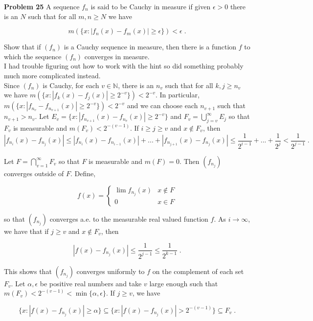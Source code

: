 \documentclass[a4paper]{article}
\begin{document}
{\bf Problem 25} A sequence $f_n$ is said to be Cauchy in measure if given $\epsilon > 0$ there is an $N$ such that for all $m,n \geq N$ we have

$$m\left(\{x : |f_n(x) - f_m(x)| \geq \epsilon \}\right) < \epsilon \;.$$

Show that if $(f_n)$ is a Cauchy sequence in measure, then there is a function $f$ to which the sequence $(f_n)$ converges in measure.\\

I had trouble figuring out how to work with the hint so did something probably much more complicated instead.\\

Since $(f_n)$ is Cauchy, for each $v \in \mathbb{N}$, there is an $n_v$ such that for all $k,j \geq n_v$ we have $m(\{x : |f_k(x) - f_j(x)| \geq 2^{-v} \}) < 2^{-v}$. In particular, $m(\{x : |f_{n_v} - f_{n_{v+1}}(x)| \geq 2^{-v}\}) < 2^{-v}$ and we can choose each $n_{v+1}$ such that $n_{v+1} > n_v$. Let $E_v = \{x : |f_{n_{v+1}}(x) - f_{n_v}(x)| \geq 2^{-v} \}$ and $F_v = \bigcup_{j = v}^\infty E_j$ so that $F_v$ is measurable and $m(F_v) < 2^{-(v-1)}$. If $i \geq j \geq v$ and $x \not\in F_v$, then
$$|f_{n_i}(x) - f_{n_j}(x)| \leq |f_{n_i}(x) - f_{n_{i-1}}(x)| + ... + |f_{n_{j+1}}(x) - f_{n_{j}}(x)| \leq \frac{1}{2^{i-1}} + ... + \frac{1}{2^j} < \frac{1}{2^{j-1}} \;.$$

Let $F = \bigcap_{v=1}^\infty F_v$ so that $F$ is measurable and $m(F) = 0$. Then $(f_{n_j})$ converges outside of $F$. Define,

$$f(x) = \begin{cases}
\lim f_{n_j}(x) & x \not\in F \\
0 & x \in F \end{cases} $$

so that $(f_{n_j})$ converges a.e. to the measurable real valued function $f$. As $i\rightarrow \infty$, we have that if $j \geq v$ and $x \not\in F_v$, then

$$|f(x) - f_{n_j}(x)| \leq \frac{1}{2^{j-1}} \leq \frac{1}{2^{k-1}} \;. $$

This shows that $(f_{n_j})$ converges uniformly to $f$ on the complement of each set $F_v$. Let $\alpha , \epsilon$ be positive real numbers and take $v$ large enough such that $m(F_v) < 2^{-(v-1)} < \min\{\alpha, \epsilon \}$. If $j \geq v$, we have

$$\{x : |f(x) - f_{n_j}(x)| \geq \alpha \} \subseteq \{x : |f(x) - f_{n_j}(x)| > 2^{-(v-1)} \} \subseteq F_v \;.$$
\end{document}
